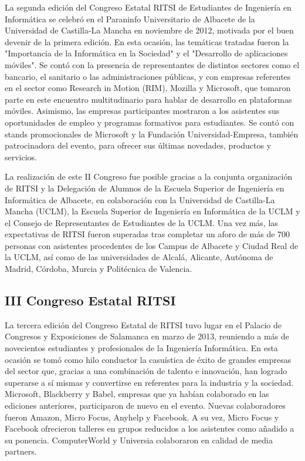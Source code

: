 \documentclass[11pt]{ritsi/article}
\begin{document}
La segunda edición del Congreso Estatal RITSI de Estudiantes de Ingeniería en Informática se celebró en el Paraninfo Universitario de Albacete de la Universidad de Castilla-La Mancha en noviembre de 2012, motivada por el buen devenir de la primera edición. En esta ocasión, las temáticas tratadas fueron la "Importancia de la Informática en la Sociedad" y el "Desarrollo de aplicaciones móviles". Se contó con la presencia de representantes de distintos sectores como el bancario, el sanitario o las administraciones públicas, y con empresas referentes en el sector como Research in Motion (RIM), Mozilla y Microsoft, que tomaron parte en este encuentro multitudinario para hablar de desarrollo en plataformas móviles. Asimismo, las empresas participantes mostraron a los asistentes sus oportunidades de empleo y programas formativos para estudiantes. Se contó con stands promocionales de Microsoft y la Fundación Universidad-Empresa, también patrocinadora del evento, para ofrecer sus últimas novedades, productos y servicios.

La realización de este II Congreso fue posible gracias a la conjunta organización de RITSI y la Delegación de Alumnos de la Escuela Superior de Ingeniería en Informática de Albacete, en colaboración con la Universidad de Castilla-La Mancha (UCLM), la Escuela Superior de Ingeniería en Informática de la UCLM y el Consejo de Representantes de Estudiantes de la UCLM. Una vez más, las expectativas de RITSI fueron superadas tras completar un aforo de más de 700 personas con asistentes procedentes de los Campus de Albacete y Ciudad Real de la UCLM, así como de las universidades de Alcalá, Alicante, Autónoma de Madrid, Córdoba, Murcia y Politécnica de Valencia.

\subsection{III Congreso Estatal RITSI}

La tercera edición del Congreso Estatal de RITSI tuvo lugar en el Palacio de Congresos y Exposiciones de Salamanca en marzo de 2013, reuniendo a más de novecientos estudiantes y profesionales de la Ingeniería Informática. En esta ocasión se tomó como hilo conductor la casuística de éxito de grandes empresas del sector que, gracias a una combinación de talento e innovación, han logrado superarse a sí mismas y convertirse en referentes para la industria y la sociedad. Microsoft, Blackberry y Babel, empresas que ya habían colaborado en las ediciones anteriores, participaron de nuevo en el evento. Nuevas colaboradores fueron Amazon, Micro Focus, Anyhelp y Facebook. A su vez, Micro Focus y Facebook ofrecieron talleres en grupos reducidos a los asistentes como añadido a su ponencia. ComputerWorld y Universia colaboraron en calidad de media partners.
\end{document}
